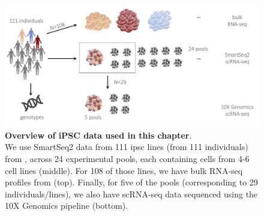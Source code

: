 \begin{figure}[h]
\centering
\includegraphics[width=14cm]{Chapter3/Fig/ips_data.png}
\caption[iPSC data]{\textbf{Overview of iPSC data used in this chapter}.\\
We use SmartSeq2 \cite{purcell2007plink} data from 111 \gls{ipsc} lines (from 111 individuals) from \cite{cuomo2020single}, across 24 experimental pools, each containing cells from 4-6 cell lines (middle).
For 108 of those lines, we have bulk RNA-seq profiles from \cite{mirauta2018population} (top).
Finally, for five of the pools (corresponding to 29 individuals/lines), we also have scRNA-seq data sequenced using the 10X Genomics pipeline \cite{zheng2017massively} (bottom).}
\label{fig:ipsc_data}
\end{figure}

 
